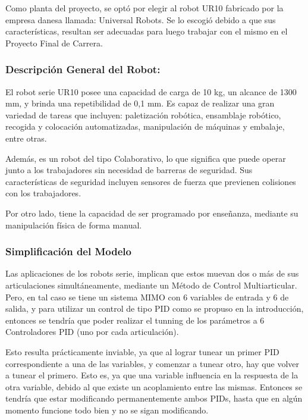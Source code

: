 \documentclass{article}
\begin{document}
Como planta del proyecto, se optó por elegir al robot UR10 fabricado por la empresa danesa llamada: Universal Robots. Se lo escogió debido a que sus características, resultan ser adecuadas para luego trabajar con el mismo en el Proyecto Final de Carrera.

\subsubsection*{Descripción General del Robot:}
\label{sec:Descripción General del Robot:}

El robot serie UR10 posee una capacidad de carga de 10 kg, un alcance de 1300 mm, y brinda una repetibilidad de 0,1 mm. Es capaz de realizar una gran variedad de tareas que incluyen: paletización robótica, ensamblaje robótico, recogida y colocación automatizadas, manipulación de máquinas y embalaje, entre otras.

Además, es un robot del tipo Colaborativo, lo que significa que puede operar junto a los trabajadores sin necesidad de barreras de seguridad. Sus características de seguridad incluyen sensores de fuerza que previenen colisiones con los trabajadores.

Por otro lado, tiene la capacidad de ser programado por enseñanza, mediante su manipulación física de forma manual.

\subsubsection*{Simplificación del Modelo}
\label{sec:Simplificación del Modelo:}

Las aplicaciones de los robots serie, implican que estos muevan dos o más de sus articulaciones simultáneamente, mediante un Método de Control Multiarticular. Pero, en tal caso se tiene un sistema MIMO con 6 variables de entrada y 6 de salida, y para utilizar un control de tipo PID como se propuso en la introducción, entonces se tendría que poder realizar el tunning de los parámetros a 6 Controladores PID (uno por cada articulación).

Esto resulta prácticamente inviable, ya que al lograr tunear un primer PID correspondiente a una de las variables, y comenzar a tunear otro, hay que volver a tunear el primero. Esto es, ya que una variable influencia en la respuesta de la otra variable, debido al que existe un acoplamiento entre las mismas. Entonces se tendría que estar modificando permanentemente ambos PIDs, hasta que en algún momento funcione todo bien y no se sigan modificando.
\end{document}
